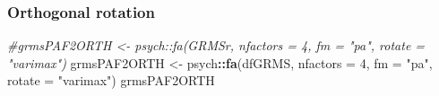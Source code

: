 \documentclass[
  english,
]{book}
\newenvironment{Shaded}{\begin{snugshade}}{\end{snugshade}}
\newcommand{\CommentTok}[1]{\textcolor[rgb]{0.56,0.35,0.01}{\textit{#1}}}
\newcommand{\DataTypeTok}[1]{\textcolor[rgb]{0.13,0.29,0.53}{#1}}
\newcommand{\DecValTok}[1]{\textcolor[rgb]{0.00,0.00,0.81}{#1}}
\newcommand{\KeywordTok}[1]{\textcolor[rgb]{0.13,0.29,0.53}{\textbf{#1}}}
\newcommand{\NormalTok}[1]{#1}
\newcommand{\OperatorTok}[1]{\textcolor[rgb]{0.81,0.36,0.00}{\textbf{#1}}}
\newcommand{\StringTok}[1]{\textcolor[rgb]{0.31,0.60,0.02}{#1}}
\begin{document}
\hypertarget{orthogonal-rotation-1}{%
\subsubsection{Orthogonal rotation}\label{orthogonal-rotation-1}}

\begin{Shaded}
\begin{Highlighting}[]
\CommentTok{#grmsPAF2ORTH <- psych::fa(GRMSr, nfactors = 4, fm = "pa", rotate = "varimax")}
\NormalTok{grmsPAF2ORTH <-}\StringTok{ }\NormalTok{psych}\OperatorTok{::}\KeywordTok{fa}\NormalTok{(dfGRMS, }\DataTypeTok{nfactors =} \DecValTok{4}\NormalTok{, }\DataTypeTok{fm =} \StringTok{"pa"}\NormalTok{, }\DataTypeTok{rotate =} \StringTok{"varimax"}\NormalTok{)}
\NormalTok{grmsPAF2ORTH}
\end{Highlighting}
\end{Shaded}
\end{document}
